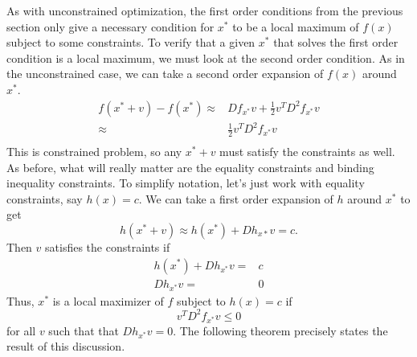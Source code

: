 As with unconstrained optimization, the first order conditions from
the previous section only give a necessary condition for $x^*$ to be a
local maximum of $f(x)$ subject to some constraints. To verify that a
given $x^*$ that solves the first order condition is a local maximum,
we must look at the second order condition. As in the unconstrained
case, we can take a second order expansion of $f(x)$ around $x^*$.
\begin{align*}
  f(x^*+v) - f(x^*) \approx & Df_{x^*} v + \frac{1}{2} v^T D^2 f_{x^*}
  v \\
  \approx &  \frac{1}{2} v^T D^2 f_{x^*} v \\
\end{align*}
This is constrained problem, so any $x^* + v$ must satisfy the
constraints as well. As before, what will really
matter are the equality constraints and binding inequality
constraints. To simplify notation, let's just work with equality
constraints, say $h(x)=c$. We can take a first order expansion of $h$
around $x^*$ to get
\[ h(x^* + v) \approx h(x^*) + Dh_{x*} v  = c. \]
Then $v$ satisfies the constraints if
\begin{align*}
  h(x^*) + Dh_{x^*} v = & c \\
  Dh_{x^*} v = & 0
\end{align*}
Thus, $x^*$ is a local maximizer of $f$ subject to $h(x) = c$ if
\[ v^T D^2 f_{x^*} v \leq 0 \] for all $v$ such that that $Dh_{x^*} v
= 0$. The following theorem precisely states the result of this
discussion.
